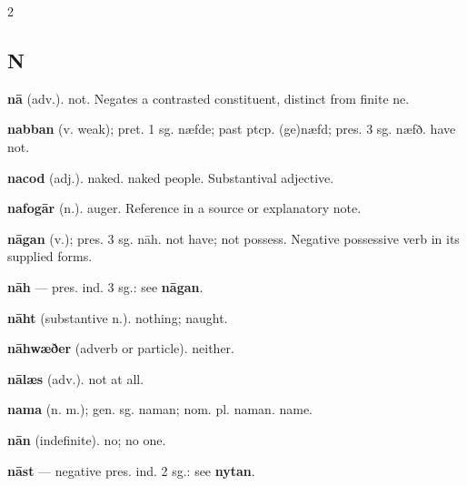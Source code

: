 \begin{multicols*}{2}
\subsection*{N}
\textbf{nā} (adv.). not. Negates a contrasted constituent, distinct from finite ne.\par
\textbf{nabban} (v. weak); pret. 1 sg. næfde; past ptcp. (ge)næfd; pres. 3 sg. næfð. have not.\par
\textbf{nacod} (adj.). naked. naked people. Substantival adjective.\par
\textbf{nafogār} (n.). auger. Reference in a source or explanatory note.\par
\textbf{nāgan} (v.); pres. 3 sg. nāh. not have; not possess. Negative possessive verb in its supplied forms.\par
\textbf{nāh} — pres. ind. 3 sg.: see \textbf{nāgan}.\par
\textbf{nāht} (substantive n.). nothing; naught.\par
\textbf{nāhwæðer} (adverb or particle). neither.\par
\textbf{nālæs} (adv.). not at all.\par
\textbf{nama} (n. m.); gen. sg. naman; nom. pl. naman. name.\par
\textbf{nān} (indefinite). no; no one.\par
\textbf{nāst} — negative pres. ind. 2 sg.: see \textbf{nytan}.\par

\end{multicols*}
